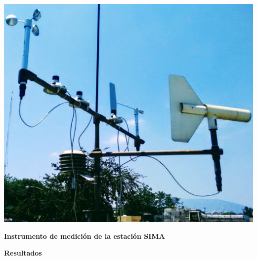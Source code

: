 \documentclass{article}
\begin{document}
\begin{minipage}{0.18\linewidth}
\includegraphics[scale=0.16]{images/instru.eps}
\begin{center}
\textbf{\textcolor{ver}{Instrumento de medición de la estación SIMA}}
\end{center}
\end{minipage}
\begin{center}
\begin{shaded}
\textbf{\textcolor{ver}{Resultados}}
\end{shaded}
\end{center}
\hspace{-1.3cm}
\end{document}
